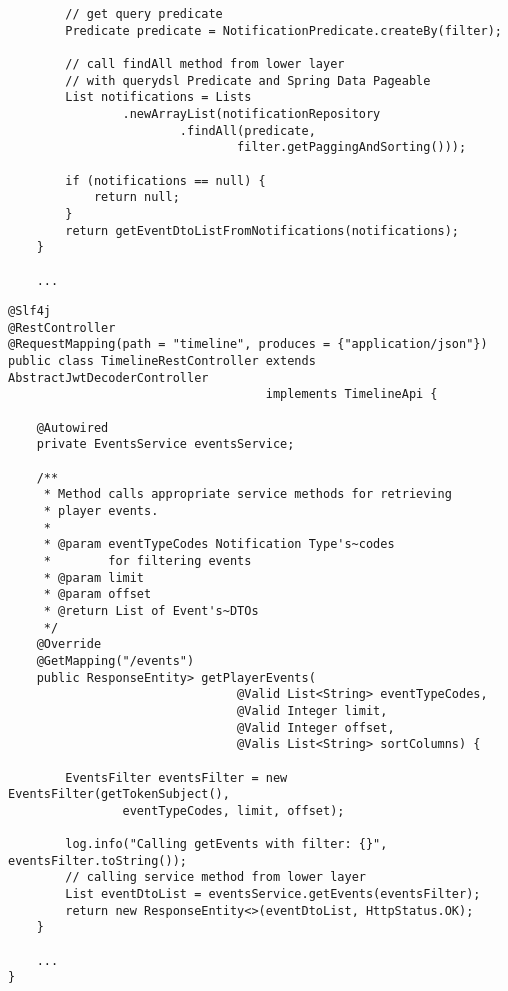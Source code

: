 \documentclass[twoside, 12pt]{article}
\begin{document}
{{\begin{lstlisting}
        // get query predicate
        Predicate predicate = NotificationPredicate.createBy(filter);

        // call findAll method from lower layer
        // with querydsl Predicate and Spring Data Pageable
        List notifications = Lists
                .newArrayList(notificationRepository
                        .findAll(predicate,
                                filter.getPaggingAndSorting()));

        if (notifications == null) {
            return null;
        }
        return getEventDtoListFromNotifications(notifications);
    }

    ...

\end{lstlisting}

\clearpage


\begin{lstlisting}
@Slf4j
@RestController
@RequestMapping(path = "timeline", produces = {"application/json"})
public class TimelineRestController extends AbstractJwtDecoderController
                                    implements TimelineApi {

    @Autowired
    private EventsService eventsService;

    /**
     * Method calls appropriate service methods for retrieving
     * player events.
     *
     * @param eventTypeCodes Notification Type's~codes
     *        for filtering events
     * @param limit
     * @param offset
     * @return List of Event's~DTOs
     */
    @Override
    @GetMapping("/events")
    public ResponseEntity> getPlayerEvents(
                                @Valid List<String> eventTypeCodes,
                                @Valid Integer limit,
                                @Valid Integer offset,
                                @Valis List<String> sortColumns) {

        EventsFilter eventsFilter = new EventsFilter(getTokenSubject(),
                eventTypeCodes, limit, offset);

        log.info("Calling getEvents with filter: {}", eventsFilter.toString());
        // calling service method from lower layer
        List eventDtoList = eventsService.getEvents(eventsFilter);
        return new ResponseEntity<>(eventDtoList, HttpStatus.OK);
    }

    ...
}
\end{lstlisting}

\clearpage

}}
\end{document}
